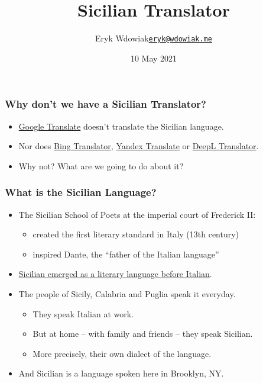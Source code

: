 \documentclass{beamer}
\title{Sicilian Translator}
\author{\texorpdfstring{Eryk Wdowiak\newline\href{eryk@wdowiak.me}{\texttt{eryk@wdowiak.me}}}{Eryk Wdowiak}}
\institute{Project Napizia}
\date{10 May 2021}
\begin{document}

\begin{frame}
  \titlepage
\end{frame}


\begin{frame}
  \frametitle{Why don't we have a Sicilian Translator?}
  \vspace{-1.0em}
  \begin{itemize}
  \item \href{https://translate.google.com/}{Google Translate} doesn't translate the Sicilian language.
  \item Nor does \href{https://www.bing.com/translator/}{Bing Translator},
    \href{https://translate.yandex.com/}{Yandex Translate} or
    \href{https://www.deepl.com/translator}{DeepL Translator}.
    \vspace{1em}
    \item Why not?  What are we going to do about it?
  \end{itemize} 
\end{frame}


\begin{frame}
  \frametitle{What is the Sicilian Language?}
  \vspace{-1.0em}
  \begin{itemize}
  \item The Sicilian School of Poets at the imperial court of Frederick II:
    \begin{itemize}
    \item created the first literary standard in Italy (13th century)
    \item inspired Dante, the ``father of the Italian language''
    \end{itemize}
  \vspace{0.65em}
  \item \underline{Sicilian emerged as a literary language before Italian}.
  \vspace{1em}
  \item The people of Sicily, Calabria and Puglia speak it everyday.
    \begin{itemize}
    \item They speak Italian at work.
    \item But at home -- with family and friends -- they speak Sicilian.
    \item More precisely, their own dialect of the language.
    \end{itemize}
  \vspace{0.65em}
  \item And Sicilian is a language spoken here in Brooklyn, NY.
  \end{itemize} 
\end{frame}
\end{document}

